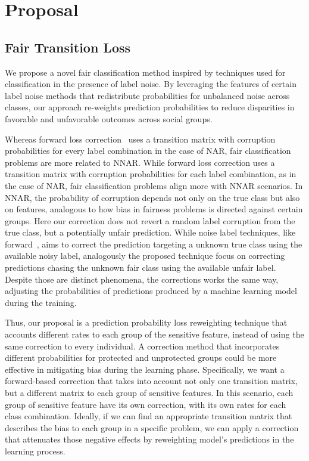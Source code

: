 \chapter{Proposal}

\section{Fair Transition Loss} \label{sec:proposal}

We propose a novel fair classification method inspired by techniques used for classification in the presence of label noise. By leveraging the features of certain label noise methods that redistribute probabilities for unbalanced noise across classes, our approach re-weights prediction probabilities to reduce disparities in favorable and unfavorable outcomes across social groups.

Whereas forward loss correction~\citep{Patrini2017} uses a transition matrix with corruption probabilities for every label combination in the case of NAR, fair classification problems are more related to NNAR. While forward loss correction uses a transition matrix with corruption probabilities for each label combination, as in the case of NAR, fair classification problems align more with NNAR scenarios. In NNAR, the probability of corruption depends not only on the true class but also on features, analogous to how bias in fairness problems is directed against certain groups. Here our correction does not revert a random label corruption from the true class, but a potentially unfair prediction. While noise label techniques, like forward~\citep{Patrini2017}, aims to correct the prediction targeting a unknown true class using the available noisy label, analogously the proposed technique focus on correcting predictions chasing the unknown fair class using the available unfair label. Despite those are distinct phenomena, the corrections works the same way, adjusting the probabilities of predictions produced by a machine learning model during the training. 

Thus, our proposal is a prediction probability loss reweighting technique that accounts different rates to each group of the sensitive feature, instead of using the same correction to every individual. A correction method that incorporates different probabilities for protected and unprotected groups could be more effective in mitigating bias during the learning phase. Specifically, we want a forward-based correction that takes into account not only one transition matrix, but a different matrix to each group of sensitive features. In this scenario, each group of sensitive feature have its own correction, with its own rates for each class combination. Ideally, if we can find an appropriate transition matrix that describes the bias to each group in a specific problem, we can apply a correction that attenuates those negative effects by reweighting model's predictions in the learning process. 

